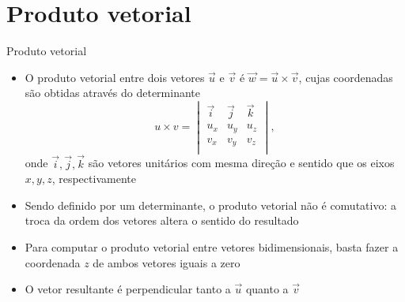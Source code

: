 \section{Produto vetorial}

\begin{frame}[fragile]{Produto vetorial}

    \begin{itemize}
        \item O produto vetorial entre dois vetores $\vec{u}$ e $\vec{v}$ é $\vec{w} = \vec{u}
        \times \vec{v}$, cujas coordenadas são obtidas através do determinante 
        \[
            u\times v = \begin{vmatrix}
                \vec{i} & \vec{j} & \vec{k} \\
                u_x & u_y & u_z \\
                v_x & v_y & v_z \\
            \end{vmatrix},
        \]
        onde $\vec{i}, \vec{j}, \vec{k}$ são vetores unitários com mesma direção e sentido que os 
        eixos $x, y, z$, respectivamente
        \pause

        \item Sendo definido por um determinante, o produto vetorial não é comutativo: a troca da 
            ordem dos vetores altera o sentido do resultado
        \pause

        \item Para computar o produto vetorial entre vetores bidimensionais, basta fazer a 
            coordenada $z$ de ambos vetores iguais a zero
        \pause

        \item O vetor resultante é perpendicular tanto a $\vec{u}$ quanto a $\vec{v}$ 

    \end{itemize}

\end{frame}

